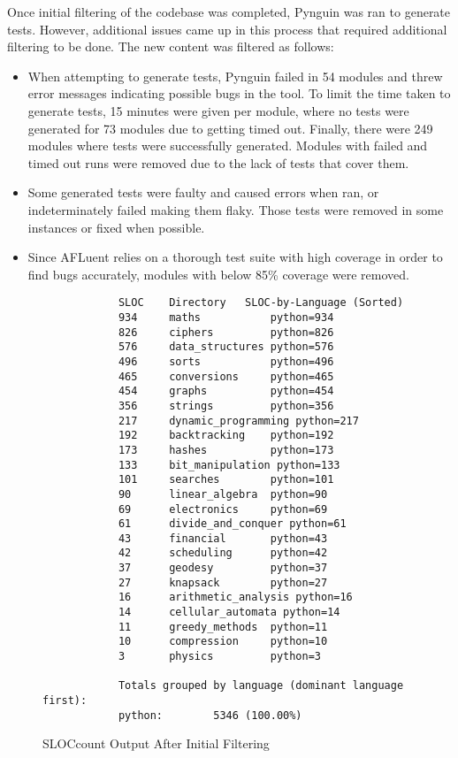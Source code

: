 Once initial filtering of the codebase was completed, Pynguin was ran to
generate tests. However, additional issues came up in this process that required
additional filtering to be done. The new content was filtered as follows:
\begin{itemize}
    \item When attempting to generate tests,
    Pynguin failed in 54 modules and threw error messages indicating possible
    bugs in the tool. To limit the time taken to generate tests, 15 minutes were
    given per module, where no tests were generated for 73 modules due to
    getting timed out. Finally, there were 249 modules where tests were
    successfully generated. Modules with failed and timed out runs were removed
    due to the lack of tests that cover them.
    \item Some generated tests were faulty and caused errors when ran, or
    indeterminately failed making them flaky. Those tests were removed in some
    instances or fixed when possible.
    \item Since AFLuent relies on a thorough test suite with high coverage in
    order to find bugs accurately, modules with below 85\% coverage were removed.
\end{itemize}

\begin{figure}[!htb]
	\begin{center}
		\begin{lstlisting}
            SLOC	Directory	SLOC-by-Language (Sorted)
            934     maths           python=934
            826     ciphers         python=826
            576     data_structures python=576
            496     sorts           python=496
            465     conversions     python=465
            454     graphs          python=454
            356     strings         python=356
            217     dynamic_programming python=217
            192     backtracking    python=192
            173     hashes          python=173
            133     bit_manipulation python=133
            101     searches        python=101
            90      linear_algebra  python=90
            69      electronics     python=69
            61      divide_and_conquer python=61
            43      financial       python=43
            42      scheduling      python=42
            37      geodesy         python=37
            27      knapsack        python=27
            16      arithmetic_analysis python=16
            14      cellular_automata python=14
            11      greedy_methods  python=11
            10      compression     python=10
            3       physics         python=3

            Totals grouped by language (dominant language first):
            python:        5346 (100.00%)

        \end{lstlisting}
		\caption{\label{fig:SLOCcount_phase2} SLOCcount Output After Initial Filtering}
	\end{center}
\end{figure}

